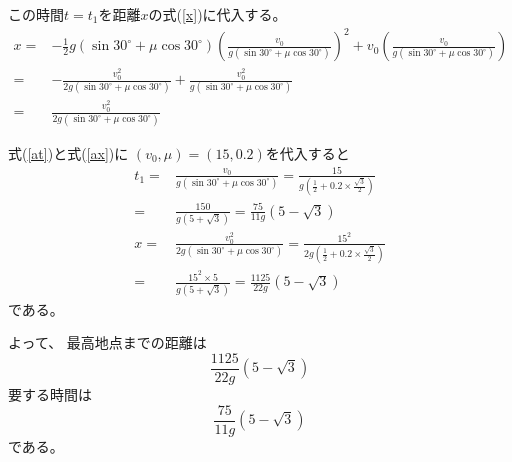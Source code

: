 \documentclass[12pt,b5paper]{ltjsarticle}
\begin{document}
この時間$t=t_1$を距離$x$の式(\ref{x})に代入する。
\begin{align}
 x =& -\frac{1}{2}g ( \sin 30^{\circ} + \mu \cos 30^{\circ} )\left(\frac{v_0}{g ( \sin 30^{\circ} + \mu \cos 30^{\circ} )}\right)^2 + v_0\left(\frac{v_0}{g ( \sin 30^{\circ} + \mu \cos 30^{\circ} )}\right)\\
 =& -\frac{v_0^2}{2g( \sin 30^{\circ} + \mu \cos 30^{\circ} )}
 + \frac{v_0^2}{g ( \sin 30^{\circ} + \mu \cos 30^{\circ} )}\\
 =& \frac{v_0^2}{2g ( \sin 30^{\circ} + \mu \cos 30^{\circ} )}\label{ax}
\end{align}

式(\ref{at})と式(\ref{ax})に
$(v_0,\mu)=(15, 0.2)$を代入すると
\begin{align}
 t_1 =& \frac{v_0}{g ( \sin 30^{\circ} + \mu \cos 30^{\circ} )}
 = \frac{15}{g ( \frac{1}{2} + 0.2 \times \frac{\sqrt{3}}{2} )}\\
 =& \frac{150}{g(5+\sqrt{3})}
 = \frac{75}{11g}(5-\sqrt{3})\\
%
 x =& \frac{v_0^2}{2g ( \sin 30^{\circ} + \mu \cos 30^{\circ} )}
 = \frac{15^2}{2g ( \frac{1}{2} + 0.2 \times \frac{\sqrt{3}}{2} )}\\
 =& \frac{15^2 \times 5}{g ( 5+\sqrt{3} )}
 = \frac{1125}{22g} ( 5-\sqrt{3} )
\end{align}
である。

よって、
最高地点までの距離は
\begin{equation}
 \frac{1125}{22g} ( 5-\sqrt{3} )
\end{equation}
要する時間は
\begin{equation}
 \frac{75}{11g}(5-\sqrt{3})
\end{equation}
である。
\end{document}
